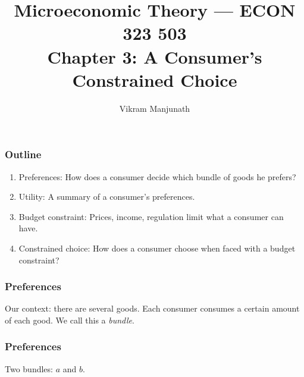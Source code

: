 \documentclass[xcolor=pdftex,dvipsnames]{beamer}
\title{Microeconomic Theory --- ECON 323 503 \\ Chapter 3: A
  Consumer's Constrained Choice}
\author{Vikram Manjunath}
\institute{Texas A\&M University}
\begin{document}
\maketitle

\begin{frame}
\frametitle{Outline}
\begin{enumerate}[<+->]
\item Preferences: How does a consumer decide which bundle of goods he prefers?
\item Utility: A summary of a consumer's preferences.
\item Budget constraint: Prices, income, regulation limit what a
  consumer can have.
\item Constrained choice: How does a consumer choose when faced with a
  budget constraint?
\end{enumerate}
\end{frame}

\begin{frame}
\frametitle{Preferences}
Our context: there are several goods. Each consumer consumes a certain
amount of each good. We call this a \emph{bundle}.\bigskip



\end{frame}

\begin{frame}
\frametitle{Preferences}
Two bundles: $a$ and $b$.\bigskip




\end{frame}
\end{document}
